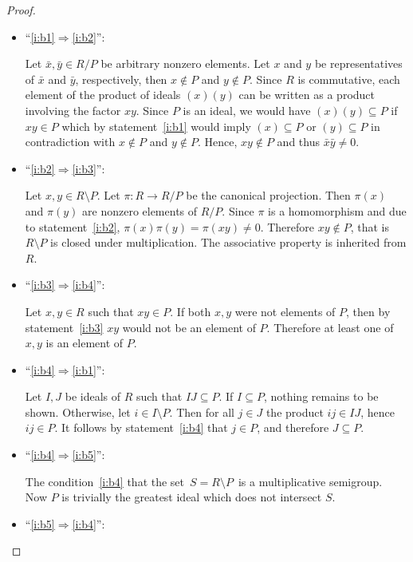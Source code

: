 \documentclass[12pt]{article}
\newcommand{\<}{\langle}
\renewcommand{\>}{\rangle}
\begin{document}
\begin{proof}
\begin{itemize}
\item ``\ref{i:b1}$\Rightarrow$\ref{i:b2}'':

Let $\bar{x},\bar{y}\in R/P$ be arbitrary nonzero elements. Let $x$
and $y$ be representatives of $\bar{x}$ and $\bar{y}$, respectively,
then $x\notin P$ and $y\notin P$. Since $R$ is commutative, each
element of the product of ideals $(x)(y)$ can be written as a product
involving the factor $xy$. Since $P$ is an ideal, we would have
$(x)(y)\subseteq P$ if $xy\in P$ which by statement~\ref{i:b1} would
imply $(x)\subseteq P$ or $(y)\subseteq P$ in contradiction with
$x\notin P$ and $y\notin P$. Hence, $xy\notin P$ and thus
$\bar{x}\bar{y}\neq 0$.

\item ``\ref{i:b2}$\Rightarrow$\ref{i:b3}'':

Let $x,y\in R\setminus P$. Let $\pi\colon R\to R/P$ be the canonical
projection. Then $\pi(x)$ and $\pi(y)$ are nonzero elements of
$R/P$. Since $\pi$ is a homomorphism and due to statement~\ref{i:b2},
$\pi(x)\pi(y)=\pi(xy)\neq 0$. Therefore $xy\notin P$, that is
$R\setminus P$ is closed under multiplication. The associative
property is inherited from $R$.

\item ``\ref{i:b3}$\Rightarrow$\ref{i:b4}'':

Let $x,y\in R$ such that $xy\in P$. If both $x,y$ were not elements of
$P$, then by statement~\ref{i:b3} $xy$ would not be an element of
$P$. Therefore at least one of $x,y$ is an element of $P$.

\item ``\ref{i:b4}$\Rightarrow$\ref{i:b1}'':

Let $I,J$ be ideals of $R$ such that $IJ\subseteq P$. If $I\subseteq
P$, nothing remains to be shown. Otherwise, let $i\in I\setminus
P$. Then for all $j\in J$ the product $ij\in IJ$, hence $ij\in P$. It
follows by statement~\ref{i:b4} that $j\in P$, and therefore
$J\subseteq P$.

\item ``\ref{i:b4}$\Rightarrow$\ref{i:b5}'':

The condition~\ref{i:b4}  that the set\, $S = R\setminus P$\, is a multiplicative semigroup.\, Now $P$ is trivially the greatest ideal which does not intersect $S$.

\item ``\ref{i:b5}$\Rightarrow$\ref{i:b4}'':


\end{itemize}
\end{proof}
\end{document}
